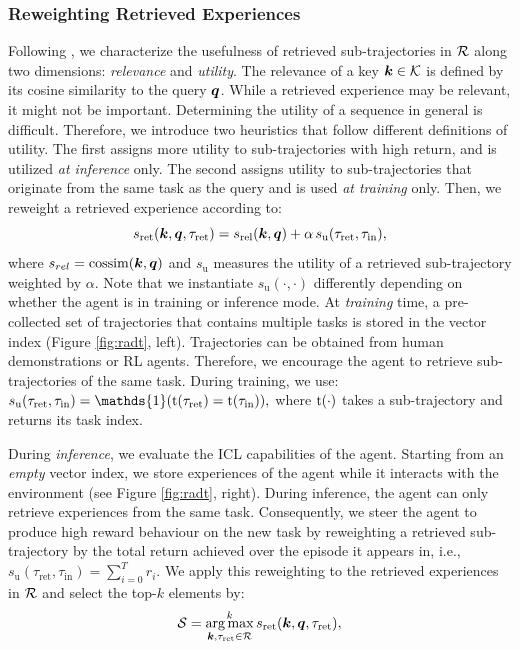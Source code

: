 \documentclass{article} %
\begin{document}
\subsubsection{Reweighting Retrieved Experiences} \label{sec:reweighting}
Following \citet{Park:23}, we characterize the usefulness of retrieved sub-trajectories in $\mathcal{R}$ along two dimensions: \textit{relevance} and \textit{utility}. 
The relevance of a key $\bm{k} \in \mathcal{K}$ is defined by its cosine similarity to the query $\bm{q}$.
While a retrieved experience may be relevant, it might not be important.
Determining the utility of a sequence in general is difficult.
Therefore, we introduce two heuristics that follow different definitions of utility.
The first assigns more utility to sub-trajectories with high return, and is utilized \emph{at inference} only.
The second assigns utility to sub-trajectories that originate from the same task as the query and is used \emph{at training} only.
Then, we reweight a retrieved experience according to:
\begin{equation}\label{eq:retscore}
    s_{\text{ret}}(\bm{k}, \bm{q}, \tau_{\text{ret}}) = s_{\text{rel}}(\bm{k}, \bm{q}) + \alpha\, s_{\text{u}}(\tau_{\text{ret}}, \tau_{\text{in}}),
\end{equation}
where $s_{rel}=\operatorname{cossim} (\bm{k}, \bm{q})$ and $s_{\text{u}}$ measures the utility of a retrieved sub-trajectory weighted by $\alpha$.
Note that we instantiate $s_{\text{u}}(\cdot,\cdot)$ differently depending on whether the agent is in training or inference mode. 
At \emph{training} time, a pre-collected set of trajectories that contains multiple tasks is stored in the vector index (Figure \ref{fig:radt}, left). Trajectories can be obtained from human demonstrations or RL agents. 
Therefore, we encourage the agent to retrieve sub-trajectories of the same task. During training, we use:
$
    s_{\text{u}}(\tau_{\text{ret}},\tau_{\text{in}}) = \mathds{1}(\Rt(\tau_{\text{ret}}) = \Rt(\tau_{\text{in}})),
$
where $\mathrm{t}(\cdot)$ takes a sub-trajectory and returns its task index.

During \emph{inference}, we evaluate the ICL capabilities of the agent.
Starting from an \emph{empty} vector index, we store experiences of the agent while it interacts with the environment (see Figure \ref{fig:radt}, right).
During inference, the agent can only retrieve experiences from the same task.
Consequently, we steer the agent to produce high reward behaviour on the new task by reweighting a retrieved sub-trajectory by the total return achieved over the episode it appears in, i.e., $s_{\text{u}}(\tau_{\text{ret}}, \tau_{\text{in}}) = \sum_{i=0}^T r_i$.
We apply this reweighting to the retrieved experiences in $\mathcal{R}$ and select the top-$k$ elements by:
\begin{equation}\label{eq:reweight}
    \mathcal{S} = \operatorname*{arg\,max}^k_{\bm{k}, \tau_{\text{ret}} \in \mathcal{R}} s_{\text{ret}}(\bm{k}, \bm{q}, \tau_{\text{ret}}),
\end{equation}
\end{document}
